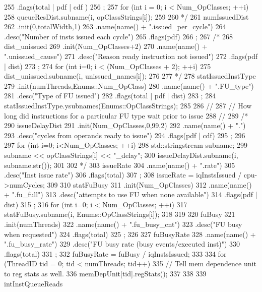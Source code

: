 \begin{DoxyCode}
{255         .flags(total | pdf | cdf )
256         ;
257     for (int i = 0; i < Num_OpClasses; ++i) {
258         queueResDist.subname(i, opClassStrings[i]);
259     }
260 */
261     numIssuedDist
262         .init(0,totalWidth,1)
263         .name(name() + ".issued_per_cycle")
264         .desc("Number of insts issued each cycle")
265         .flags(pdf)
266         ;
267 /*
268     dist_unissued
269         .init(Num_OpClasses+2)
270         .name(name() + ".unissued_cause")
271         .desc("Reason ready instruction not issued")
272         .flags(pdf | dist)
273         ;
274     for (int i=0; i < (Num_OpClasses + 2); ++i) {
275         dist_unissued.subname(i, unissued_names[i]);
276     }
277 */
278     statIssuedInstType
279         .init(numThreads,Enums::Num_OpClass)
280         .name(name() + ".FU_type")
281         .desc("Type of FU issued")
282         .flags(total | pdf | dist)
283         ;
284     statIssuedInstType.ysubnames(Enums::OpClassStrings);
285 
286     //
287     //  How long did instructions for a particular FU type wait prior to issue
288     //
289 /*
290     issueDelayDist
291         .init(Num_OpClasses,0,99,2)
292         .name(name() + ".")
293         .desc("cycles from operands ready to issue")
294         .flags(pdf | cdf)
295         ;
296 
297     for (int i=0; i<Num_OpClasses; ++i) {
298         std::stringstream subname;
299         subname << opClassStrings[i] << "_delay";
300         issueDelayDist.subname(i, subname.str());
301     }
302 */
303     issueRate
304         .name(name() + ".rate")
305         .desc("Inst issue rate")
306         .flags(total)
307         ;
308     issueRate = iqInstsIssued / cpu->numCycles;
309 
310     statFuBusy
311         .init(Num_OpClasses)
312         .name(name() + ".fu_full")
313         .desc("attempts to use FU when none available")
314         .flags(pdf | dist)
315         ;
316     for (int i=0; i < Num_OpClasses; ++i) {
317         statFuBusy.subname(i, Enums::OpClassStrings[i]);
318     }
319 
320     fuBusy
321         .init(numThreads)
322         .name(name() + ".fu_busy_cnt")
323         .desc("FU busy when requested")
324         .flags(total)
325         ;
326 
327     fuBusyRate
328         .name(name() + ".fu_busy_rate")
329         .desc("FU busy rate (busy events/executed inst)")
330         .flags(total)
331         ;
332     fuBusyRate = fuBusy / iqInstsIssued;
333 
334     for (ThreadID tid = 0; tid < numThreads; tid++) {
335         // Tell mem dependence unit to reg stats as well.
336         memDepUnit[tid].regStats();
337     }
338 
339     intInstQueueReads
}
\end{DoxyCode}
